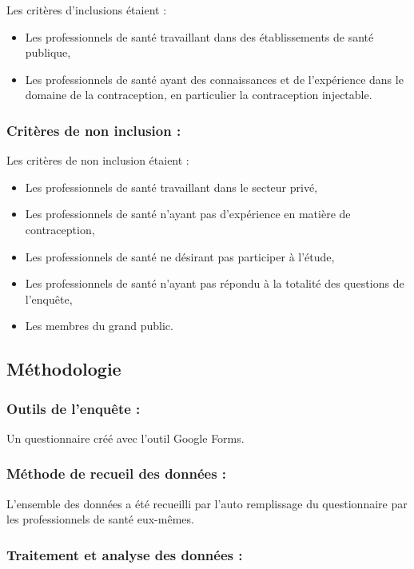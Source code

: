 Les critères d’inclusions étaient : 
\begin{itemize}
  \item Les professionnels de santé travaillant dans des établissements de santé publique,  
  \item Les professionnels de santé ayant des connaissances et de l’expérience dans le domaine de la contraception, en particulier la contraception injectable. 
\end{itemize}

\subsubsection{Critères de non inclusion : }
Les critères de non inclusion étaient : 

\begin{itemize}
  \item	Les professionnels de santé travaillant dans le secteur privé, 
  \item Les professionnels de santé n’ayant pas d’expérience en matière de contraception, 
  \item Les professionnels de santé ne désirant pas participer à l’étude, 
  \item Les professionnels de santé n’ayant pas répondu à la totalité des questions de l’enquête,
  \item	Les membres du grand public.
\end{itemize}

\subsection{Méthodologie }

\subsubsection{Outils de l’enquête :}

Un questionnaire créé avec l’outil Google Forms.

\subsubsection{Méthode de recueil des données :}
L’ensemble des données a été recueilli par l’auto remplissage du questionnaire par les professionnels de santé eux-mêmes.   

\subsubsection{Traitement et analyse des données :}

